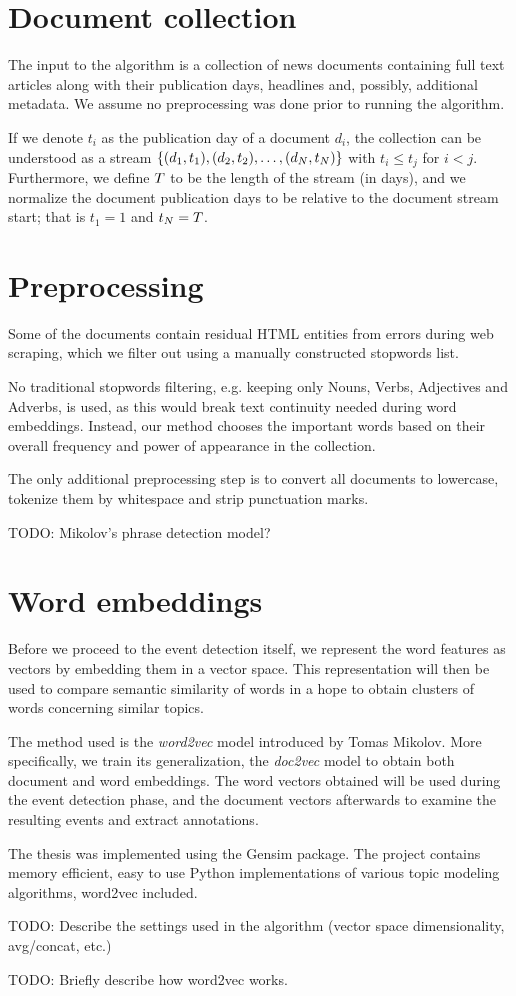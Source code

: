 \section{Document collection}
The input to the algorithm is a collection of news documents containing full text articles along with their publication days, headlines and, possibly, additional metadata. We assume no preprocessing was done prior to running the algorithm.

If we denote $t_{i}$ as the publication day of a document $d_{i}$, the collection can be understood as a stream $\left\{ (d_{1}, t_{1}), (d_{2}, t_{2}), \dots, (d_{N}, t_{N}) \right\}$ with $t_{i} \leq t_{j}$ for $i < j$. Furthermore, we define $T$ to be the length of the stream (in days), and we normalize the document publication days to be relative to the document stream start; that is $t_{1} = 1$ and $t_{N} = T$.


\section{Preprocessing}
Some of the documents contain residual HTML entities from errors during web scraping, which we filter out using a manually constructed stopwords list.

No traditional stopwords filtering, e.g. keeping only Nouns, Verbs, Adjectives and Adverbs, is used, as this would break text continuity needed during word embeddings. Instead, our method chooses the important words based on their overall frequency and power of appearance in the collection.

The only additional preprocessing step is to convert all documents to lowercase, tokenize them by whitespace and strip punctuation marks.

{\color{red} TODO: Mikolov's phrase detection model?}


\section{Word embeddings} \label{word-embeddings}
Before we proceed to the event detection itself, we represent the word features as vectors by embedding them in a vector space. This representation will then be used to compare semantic similarity of words in a hope to obtain clusters of words concerning similar topics.

The method used is the \textit{word2vec} model \cite{word2vec} introduced by Tomas Mikolov. More specifically, we train its generalization, the \textit{doc2vec} model \cite{doc2vec} to obtain both document and word embeddings. The word vectors obtained will be used during the event detection phase, and the document vectors afterwards to examine the resulting events and extract annotations.

The thesis was implemented using the Gensim \cite{gensim} package. The project contains memory efficient, easy to use Python implementations of various topic modeling algorithms, word2vec included.

{\color{red} TODO: Describe the settings used in the algorithm (vector space dimensionality, avg/concat, etc.)}

{\color{red} TODO: Briefly describe how word2vec works.}
